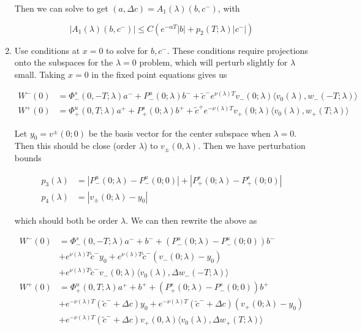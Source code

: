 \documentclass[12pt]{article}
\begin{document}
\begin{enumerate}
Then we can solve to get $(a, \Delta c) = A_1(\lambda)(b, c^-)$, with

\[
|A_1(\lambda)(b, c^-)| \leq C( e^{-\alpha T} |b| + p_2(T; \lambda)|c^-| )
\]

\item Use conditions at $x = 0$ to solve for $b, c^-$. These conditions require projections onto the subspaces for the $\lambda = 0$ problem, which will perturb slightly for $\lambda$ small. Taking $x = 0$ in the fixed point equations gives us

\begin{align*}
W^-(0) &= \Phi^s_-(0, -T; \lambda)a^- + P^u_-(0; \lambda)b^- + \tilde{c}^- e^{\nu(\lambda)T} v_-(0; \lambda) \langle v_0(\lambda), w_-(-T; \lambda) \rangle \\
W^+(0) &= \Phi^u_+(0, T; \lambda)a^+ + P^s_+(0; \lambda)b^+ + \tilde{c}^+ e^{-\nu(\lambda)T} v_+(0; \lambda) \langle v_0(\lambda), w_+(T; \lambda) \rangle 
\end{align*}

Let $y_0 = v^\pm(0; 0)$ be the basis vector for the center subspace when $\lambda = 0$. Then this should be close (order $\lambda$) to $v_\pm(0,\lambda)$. Then we have perturbation bounds

\begin{align*}
p_3(\lambda) &= |P^u_-(0;\lambda) - P^u_-(0; 0)| + |P^s_+(0;\lambda) - P^s_+(0;0)|\\
p_4(\lambda) &= |v_\pm(0; \lambda) - y_0|
\end{align*}

which should both be order $\lambda$. We can then rewrite the above as

\begin{align*}
W^-(0) &= \Phi^s_-(0, -T; \lambda )a^- + b^- + (P^u_-(0; \lambda) - P^u_-(0; 0))b^- \\
&+ e^{\nu(\lambda)T} \tilde{c}^- y_0 + e^{\nu(\lambda)T} \tilde{c}^- ( v_-(0; \lambda) - y_0) \\
&+ e^{\nu(\lambda)T} \tilde{c}^- v_-(0; \lambda) \langle  v_0(\lambda), \Delta w_-(-T; \lambda)\rangle \\
W^+(0) &= \Phi^u_+(0, T; \lambda)a^+ + b^+ + (P^s_+(0; \lambda) - P^s_-(0; 0))b^+ \\
&+ e^{-\nu(\lambda)T} (\tilde{c}^- + \Delta c) y_0 + e^{-\nu(\lambda)T} (\tilde{c}^- + \Delta c) ( v_+(0; \lambda) - y_0) \\
&+ e^{-\nu(\lambda)T} (\tilde{c}^- + \Delta c) v_+(0, \lambda) \langle  v_0(\lambda), \Delta w_+(T; \lambda)\rangle
\end{align*}


\end{enumerate}
\end{document}
